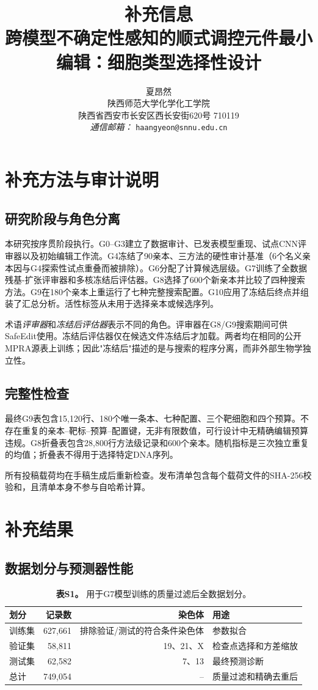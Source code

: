 \documentclass[10pt,a4paper]{article}
\title{\textbf{补充信息}\\[0.35em]
\large 跨模型不确定性感知的顺式调控元件最小编辑：细胞类型选择性设计}
\author{夏昂然\\
陕西师范大学化学化工学院\\
陕西省西安市长安区西长安街620号 710119\\[0.35em]
\textit{通信邮箱：} \texttt{haangyeon@snnu.edu.cn}}
\date{}
\begin{document}
\maketitle
\tableofcontents
\clearpage

\section{补充方法与审计说明}

\subsection{研究阶段与角色分离}

本研究按序贯阶段执行。G0--G3建立了数据审计、已发表模型重现、试点CNN评审器以及初始编辑工作流。G4冻结了90亲本、三方法的硬性审计基准（6个名义亲本因与G4探索性试点重叠而被排除）。G6分配了计算候选层级。G7训练了全数据残基-扩张评审器和多核冻结后评估器。G8选择了600个新亲本并比较了四种搜索方法。G9在180个亲本上重运行了七种完整搜索配置。G10应用了冻结后终点并组装了汇总分析。活性标签从未用于选择亲本或候选序列。

术语\emph{评审器}和\emph{冻结后评估器}表示不同的角色。评审器在G8/G9搜索期间可供SafeEdit使用。冻结后评估器仅在候选文件冻结后才加载。两者均在相同的公开MPRA源表上训练；因此"冻结后"描述的是与搜索的程序分离，而非外部生物学独立性。

\subsection{完整性检查}

最终G9表包含15,120行、180个唯一条本、七种配置、三个靶细胞和四个预算。不存在重复的亲本--靶标--预算--配置键，无非有限数值，可行设计中无精确编辑预算违规。G8折叠表包含28,800行方法级记录和600个亲本。随机指标是三次独立重复的均值；折叠表不得用于选择特定DNA序列。

所有投稿载荷均在手稿生成后重新检查。发布清单包含每个载荷文件的SHA-256校验和，且清单本身不参与自哈希计算。

\section{补充结果}

\subsection{数据划分与预测器性能}

\begin{table}[ht]
\centering
\caption{\textbf{表S1。} 用于G7模型训练的质量过滤后全数据划分。}
\label{tab:S1}
{\small
\begin{tabular}{lrrp{4.5cm}}
\toprule
划分 & 记录数 & 染色体 & 用途 \\
\midrule
训练集 & 627,661 & 排除验证/测试的符合条件染色体 & 参数拟合 \\
验证集 & 58,811 & 19、21、X & 检查点选择和方差缩放 \\
测试集 & 62,582 & 7、13 & 最终预测诊断 \\
\midrule
总计 & 749,054 & -- & 质量过滤和精确去重后 \\
\bottomrule
\end{tabular}
}
\end{table}
\end{document}
